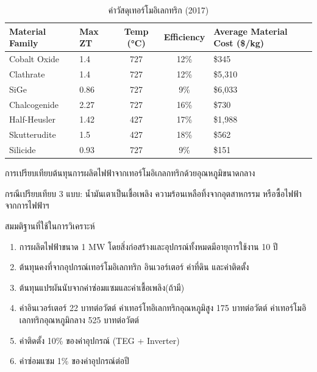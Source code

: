 \message{ !name(solar.tex)}\documentclass[
a4paper,
svgnames,
openany,
justified,
]{tufte-book}
\begin{document}
\begin{table}
  \centering
  \caption{ค่าวัสดุเทอร์โมอิเลกทริก (2017)}
  \begin{tabular}{l l c c p{2.5cm}}
    \toprule
    Material Family & Max ZT & Temp (°C) & Efficiency & Average Material Cost (\$/kg) \\
    \midrule
    Cobalt Oxide    & 1.4    & 727       & 12\%       & \$345 \\
    Clathrate       & 1.4    & 727       & 12\%       & \$5,310 \\
    SiGe            & 0.86   & 727       & 9\%        & \$6,033 \\
    Chalcogenide    & 2.27   & 727       & 16\%       & \$730 \\
    Half-Heusler    & 1.42   & 427       & 17\%       & \$1,988 \\
    Skutterudite    & 1.5    & 427       & 18\%       & \$562 \\
    Silicide        & 0.93   & 727       & 9\%        & \$151 \\
    \bottomrule
  \end{tabular}
  \label{fig:teg mat cost}
\end{table}

\vspace{5mm}

\begin{ตัวอย่าง} การเปรียบเทียบต้นทุนการผลิตไฟฟ้าจากเทอร์โมอิเกลกทริกด้วยอุณหภูมิขนาดกลาง
  
  กรณีเปรียบเทียบ 3 แบบ: น้ำมันเตาเป็นเชื้อเพลิง ความร้อนเหลือทิ้งจากอุตสาหกรรม หรือซื้อไฟฟ้าจากการไฟฟ้าฯ
  
  สมมติฐานที่ใช้ในการวิเคราะห์ 
  
  \begin{enumerate}
  \item การผลิตไฟฟ้าขนาด 1 MW โดยสิ่งก่อสร้างและอุปกรณ์ทั้งหมดมีอายุการใช้งาน 10 ปี
  \item ต้นทุนคงที่จากอุปกรณ์เทอร์โมอิเลกทริก อินเวอร์เตอร์ ค่าที่ดิน และค่าติดตั้ง
  \item ต้นทุนแปรผันนับจากค่าซ่อมแซมและค่าเชื้อเพลิง(ถ้ามี)
  \item ค่าอินเวอร์เตอร์ 22 บาทต่อวัตต์ ค่าเทอร์โทอิเลกทริกอุณหภูมิสูง 175 บาทต่อวัตต์ ค่าเทอร์โมอิเลกทริกอุณหภูมิกลาง 525 บาทต่อวัตต์
  \item ค่าติดตั้ง 10\% ของค่าอุปกรณ์ (TEG + Inverter)
  \item ค่าซ่อมแซม 1\% ของค่าอุปกรณ์ต่อปี
  \end{enumerate}
\end{ตัวอย่าง}
\end{document}
